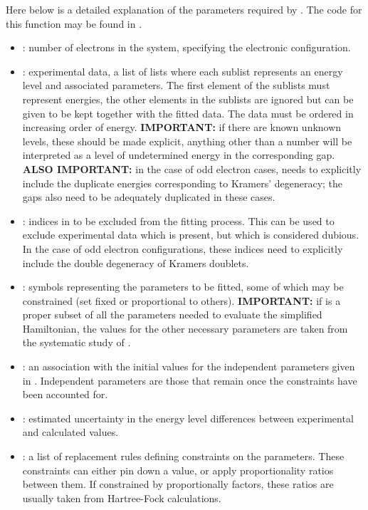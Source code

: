 \documentclass[11pt, twoside,openright]{article}
\begin{document}
Here below is a detailed explanation of the parameters required by . The code for this function  may be found in .

\begin{itemize}
	\item {}: number of electrons in the system, specifying the electronic configuration.

	\item {}: experimental data, a list of lists where each sublist represents an energy level and associated parameters. The first element of the sublists must represent energies, the other elements in the sublists are ignored but can be given to be kept together with the fitted data. The data must be ordered in increasing order of energy. \textbf{IMPORTANT:} if there are known unknown levels, these should be made explicit, anything other than a number will be interpreted as a level of undetermined energy in the corresponding gap. \textbf{ALSO IMPORTANT:} in the case of odd electron cases,  needs to explicitly include the duplicate energies corresponding to Kramers' degeneracy; the gaps also need to be adequately duplicated in these cases.  

	\item {}: indices in  to be excluded from the fitting process. This can be used to exclude experimental data which is present, but which is considered dubious. In the case of odd electron configurations, these indices need to explicitly include the double degeneracy of Kramers doublets.

	\item {}: symbols representing the parameters to be fitted, some of which may be constrained (set fixed or proportional to others). \textbf{IMPORTANT:} if  is a proper subset of all the parameters needed to evaluate the simplified Hamiltonian, the values for the other necessary parameters are taken from the \bill systematic study of \LaFthree.

	\item {}: an association with the initial values for the independent parameters given in . Independent parameters are those that remain once the constraints have been accounted for.

	\item {}: estimated uncertainty in the energy level differences between experimental and calculated values.

	\item {}: a list of replacement rules defining constraints on the parameters. These constraints can either pin down a value, or apply proportionality ratios between them. If constrained by proportionally factors, these ratios are usually taken from Hartree-Fock calculations.
\end{itemize}
\end{document}
